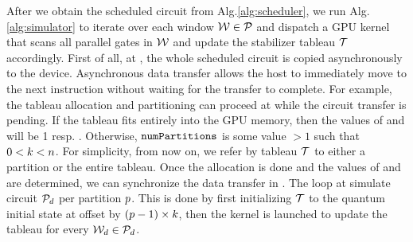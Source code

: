 \documentclass[runningheads]{llncs}
\begin{document}
After we obtain the scheduled circuit \circuitScheduled from Alg.\ref{alg:scheduler}, we run Alg.\ref{alg:simulator} to iterate over each window $\mathcal{W} \in \mathcal{P}$ and dispatch a GPU kernel that scans all parallel gates in $\mathcal{W}$ and update the stabilizer tableau $\mathcal{T}$ accordingly. 
First of all, at , the whole scheduled circuit is copied asynchronously to the device. Asynchronous data transfer allows the host to immediately move to the next instruction without waiting for the transfer to complete. For example, the tableau allocation and partitioning can proceed at  while the circuit transfer is pending. If the tableau fits entirely into the GPU memory, then the values of \numPartitions and \tableauHeight will be 1 resp. \numQubits. Otherwise, $\texttt{numPartitions}$ is some value $>1$ such that $0 < k < n$. For simplicity, from now on, we refer by tableau $\mathcal{T}$ to either a partition or the entire tableau.
Once the allocation is done and the values of \numPartitions and \tableauHeight are determined, we can synchronize the data transfer in . 
The loop at  simulate circuit $\mathcal{P}_d$ per partition $p$. This is done by first initializing $\mathcal{T}$ to the quantum initial state at  offset by $(p - 1) \times k$, then the kernel \simulateWindow is launched to update the tableau for every $\mathcal{W}_d \in \mathcal{P}_d$.
\end{document}
